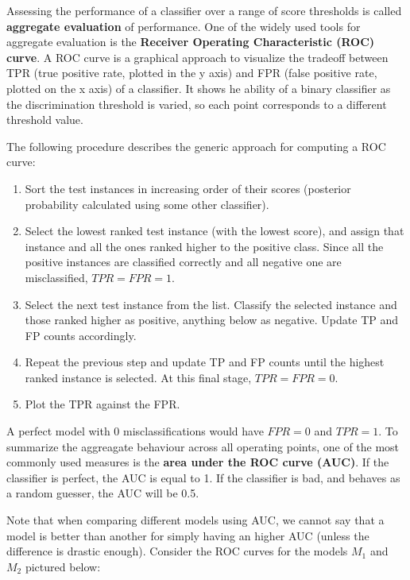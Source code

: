Assessing the performance of a classifier over a range of score thresholds is called \textbf{aggregate evaluation} of performance. One of the widely used tools for aggregate evaluation is the \textbf{Receiver Operating Characteristic (ROC) curve}. A ROC curve is a graphical approach to visualize the tradeoff between TPR (true positive rate, plotted in the y axis) and FPR (false positive rate, plotted on the x axis) of a classifier. It shows he ability of a binary classifier as the discrimination threshold is varied, so each point corresponds to a different threshold value.

The following procedure describes the generic approach for computing a ROC curve:

\begin{enumerate}
    \item Sort the test instances in increasing order of their scores (posterior probability calculated using some other classifier).

    \item Select the lowest ranked test instance (with the lowest score), and assign that instance and all the ones ranked higher to the positive class. Since all the positive instances are classified correctly and all negative one are misclassified, $TPR = FPR = 1$.

    \item Select the next test instance from the list. Classify the selected instance and those ranked higher as positive, anything below as negative. Update TP and FP counts accordingly.

    \item Repeat the previous step and update TP and FP counts until the highest ranked instance is selected. At this final stage, $TPR = FPR = 0$.

    \item Plot the TPR against the FPR.
\end{enumerate}

A perfect model with 0 misclassifications would have $FPR = 0$ and $TPR = 1$. To summarize the aggreagate behaviour across all operating points, one of the most commonly used measures is the \textbf{area under the ROC curve (AUC)}. If the classifier is perfect, the AUC is equal to 1. If the classifier is bad, and behaves as a random guesser, the AUC will be 0.5.

Note that when comparing different models using AUC, we cannot say that a model is better than another for simply having an higher AUC (unless the difference is drastic enough). Consider the ROC curves for the models $M_1$ and $M_2$ pictured below:

